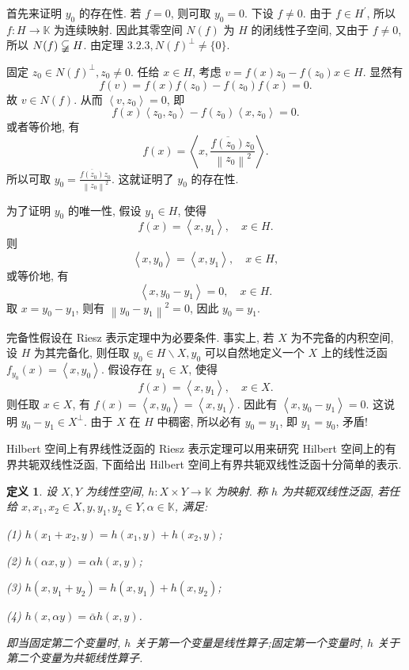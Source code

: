 \documentclass[openany]{ctexbook}
\makeatletter
\theoremstyle{kaiti}
\newtheorem{definition}{定义}[section]
\theoremstyle{normal}
\renewenvironment{proof}[1][\proofname]{\par
    \pushQED{\qed}%
    \normalfont \topsep6\p@\@plus6\p@\relax
    \trivlist
    \item\relax
    {\heiti #1}\hspace{2\labelsep}\ignorespaces
  }{%
    \popQED\endtrivlist\@endpefalse
  }
\makeatother
\begin{document}
\begin{proof}
首先来证明 $y_0$ 的存在性. 若 $f=0$, 则可取 $y_0=0$. 下设 $f \neq 0$. 由于 $f \in H^{\prime}$, 所以 $f: H \rightarrow \mathbb{K}$ 为连续映射. 因此其零空间 $N(f)$ 为 $H$ 的闭线性子空间, 又由于 $f \neq 0$, 所以 $N(f) \varsubsetneqq H$. 由定理 $3.2.3, N(f)^{\perp} \neq\{0\}$.

固定 $z_0 \in N(f)^{\perp}, z_0 \neq 0$. 任给 $x \in H$, 考虑 $v=f(x) z_0-f\left(z_0\right) x \in H$. 显然有
$$
f(v)=f(x) f\left(z_0\right)-f\left(z_0\right) f(x)=0.
$$
故 $v \in N(f)$. 从而 $\left\langle v, z_0\right\rangle=0$, 即
$$
f(x)\left\langle z_0, z_0\right\rangle-f\left(z_0\right)\left\langle x, z_0\right\rangle=0.
$$
或者等价地, 有
$$
f(x)=\left\langle x, \frac{\overline{f\left(z_0\right)} z_0}{\left\|z_0\right\|^2}\right\rangle.
$$
所以可取 $y_0=\frac{\overline{f\left(z_0\right)} z_0}{\left\|z_0\right\|^2}$. 这就证明了 $y_0$ 的存在性.

为了证明 $y_0$ 的唯一性, 假设 $y_1 \in H$, 使得
$$
f(x)=\left\langle x, y_1\right\rangle, \quad x \in H.
$$
则
$$
\left\langle x, y_0\right\rangle=\left\langle x, y_1\right\rangle, \quad x \in H,
$$
或等价地, 有
$$
\left\langle x, y_0-y_1\right\rangle=0, \quad x \in H.
$$
取 $x=y_0-y_1$, 则有 $\left\|y_0-y_1\right\|^2=0$, 因此 $y_0=y_1$.
\end{proof}

完备性假设在 Riesz 表示定理中为必要条件. 事实上, 若 $X$ 为不完备的内积空间, 设 $H$ 为其完备化, 则任取 $y_0 \in H \backslash X, y_0$ 可以自然地定义一个 $X$ 上的线性泛函 $f_{y_0}(x)=\left\langle x, y_0\right\rangle$. 假设存在 $y_1 \in X$, 使得
$$
f(x)=\left\langle x, y_1\right\rangle, \quad x \in X.
$$
则任取 $x \in X$, 有 $f(x)=\left\langle x, y_0\right\rangle=\left\langle x, y_1\right\rangle$. 因此有 $\left\langle x, y_0-y_1\right\rangle=0$. 这说明 $y_0-y_1 \in X^{\perp}$. 由于 $X$ 在 $H$ 中稠密, 所以必有 $y_0=y_1$, 即 $y_1=y_0$, 矛盾!

Hilbert 空间上有界线性泛函的 Riesz 表示定理可以用来研究 Hilbert 空间上的有界共轭双线性泛函, 下面给出 Hilbert 空间上有界共轭双线性泛函十分简单的表示.

\begin{definition}
设 $X, Y$ 为线性空间, $h: X \times Y \rightarrow \mathbb{K}$ 为映射. 称 $h$ 为共轭双线性泛函, 若任给 $x, x_1, x_2 \in X, y, y_1, y_2 \in Y, \alpha \in \mathbb{K}$, 满足:

(1) $h\left(x_1+x_2, y\right)=h\left(x_1, y\right)+h\left(x_2, y\right)$;

(2) $h(\alpha x, y)=\alpha h(x, y)$;

(3) $h\left(x, y_1+y_2\right)=h\left(x, y_1\right)+h\left(x, y_2\right)$;

(4) $h(x, \alpha y)=\bar{\alpha} h(x, y)$.

即当固定第二个变量时, $h$ 关于第一个变量是线性算子;固定第一个变量时, $h$ 关于第二个变量为共轭线性算子.
\end{definition}
\end{document}
